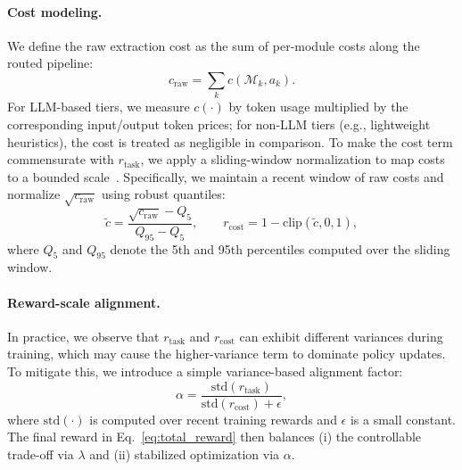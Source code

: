 \paragraph{Cost modeling.}
We define the raw extraction cost as the sum of per-module costs along the routed pipeline:
\begin{equation}
c_{\text{raw}} = \sum_{k} c(\mathcal{M}_k, a_k).
\end{equation}
For LLM-based tiers, we measure $c(\cdot)$ by token usage multiplied by the corresponding input/output token prices; for non-LLM tiers (e.g., lightweight heuristics), the cost is treated as negligible in comparison. 
To make the cost term commensurate with $r_{\text{task}}$, we apply a sliding-window normalization to map costs to a bounded scale~\citep{zhang2025router}. Specifically, we maintain a recent window of raw costs and normalize $\sqrt{c_{\text{raw}}}$ using robust quantiles:
\begin{equation}
\tilde{c} = \frac{\sqrt{c_{\text{raw}}} - Q_{5}}{Q_{95} - Q_{5}}, 
\qquad
r_{\text{cost}} = 1 - \mathrm{clip}(\tilde{c}, 0, 1),
\label{eq:cost_norm}
\end{equation}
where $Q_{5}$ and $Q_{95}$ denote the 5th and 95th percentiles computed over the sliding window.

\paragraph{Reward-scale alignment.}
In practice, we observe that $r_{\text{task}}$ and $r_{\text{cost}}$ can exhibit different variances during training, which may cause the higher-variance term to dominate policy updates. To mitigate this, we introduce a simple variance-based alignment factor:
\begin{equation}
\alpha = \frac{\mathrm{std}(r_{\text{task}})}{\mathrm{std}(r_{\text{cost}}) + \epsilon},
\label{eq:std_align}
\end{equation}
where $\mathrm{std}(\cdot)$ is computed over recent training rewards and $\epsilon$ is a small constant. The final reward in Eq.~\ref{eq:total_reward} then balances (i) the controllable trade-off via $\lambda$ and (ii) stabilized optimization via $\alpha$.








